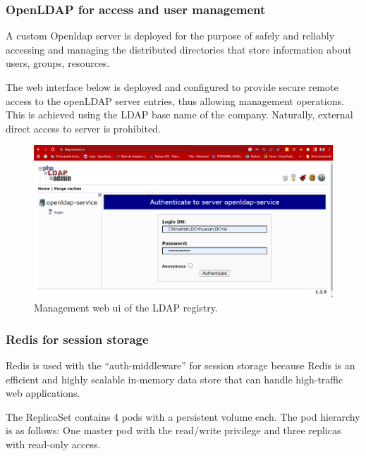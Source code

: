 \subsubsection{OpenLDAP for access and user management  }

\hspace{7mm}A custom Openldap server is deployed for the purpose of safely and reliably accessing and managing the distributed directories that store information about users, groups, resources. 

\hspace{7mm}The web interface below is deployed and configured to provide secure remote access to the openLDAP server entries, thus allowing management operations. This is achieved using the LDAP base name of the company. Naturally, external direct access to server is prohibited.

\begin{figure}[H]\centering
\includegraphics[width=1.0\textwidth,angle=00]{assets/f52.png}
\caption{Management web ui of the LDAP registry.}
\label{fig:f52}
\end{figure} 

\subsubsection{Redis for session storage }

\hspace{7mm}Redis is used with the “auth-middleware” for session storage because Redis is an efficient and highly scalable in-memory data store that can handle high-traffic web applications. 

\hspace{7mm}The ReplicaSet contains 4 pods with a persistent volume each. The pod hierarchy is as follows: One master pod with the read/write privilege and three replicas with read-only access.

